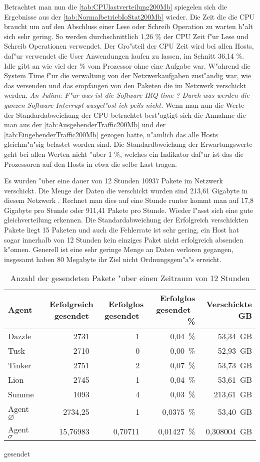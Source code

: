 Betrachtet man nun die \cref{tab:CPUlastverteilung200Mb} spiegelen sich die Ergebnisse aus der \cref{tab:NormalbetriebIoStat200Mb} wieder. %
Die Zeit die die CPU braucht um auf den Abschluss einer Lese oder Schreib Operation zu warten h"alt sich sehr gering. %
So werden durchschnittlich 1,26 \% der CPU Zeit f"ur Lese und Schreib Operationen verwendet. Der Gro"steil der CPU Zeit wird %
bei allen Hosts, daf"ur verwendet die User Anwendungen laufen zu lassen, im Schnitt 36,14 \%. Idle gibt an wie viel der \% vom Prozessor %
ohne eine Aufgabe war. W"ahrend die System Time f"ur die verwaltung von der Netzwerkaufgaben zust"andig war, wie das versenden und das empfangen von %
den Paketen die im Netzwerk verschickt werden. \emph{An Julian: F"ur was ist die Software IRQ time ? Durch was werden die ganzen Software Interrupt %
ausgel"ost ich peils nicht.}%
Wenn man nun die Werte der Standardabweichung der CPU betrachtet best"agtigt sich die Annahme die man aus der %
\cref{tab:AusgehenderTraffic200Mb} und der \cref{tab:EingehenderTraffic200Mb} gezogen hatte, n"amlich das alle Hosts gleichm"a"sig belastet worden sind. %
Die Standardbweichung der Erwartungswerte geht bei allen Werten nicht "uber 1 \%, welches ein Indikator daf"ur ist das die %
Prozessoren auf den Hosts in etwa die selbe Last tragen.  

Es wurden "uber eine dauer von 12 Stunden 10937 Pakete im Netzwerk verschickt. Die Menge der Daten die verschickt wurden sind 213,61 Gigabyte in diesem Netzwerk . %
Rechnet man dies auf eine Stunde runter kommt man auf 17,8 Gigabyte pro Stunde oder 911,41 Pakete pro Stunde. Wieder l"asst sich eine gute gleichverteilung erkennen. %
Die Standardabweichung der Erfolgreich verschickten Pakete liegt 15 Paketen und auch die Fehlerrate ist sehr gering, ein Host %
hat sogar innerhalb von 12 Stunden kein einziges Paket nicht erfolgreich absenden k"onnen. Generell ist eine sehr geringe Menge an Daten verloren %
gegangen, insgesamt haben 80 Megabyte ihr Ziel nicht Ordnungsgem"a"s erreicht. %
\begin{table}
\centering
\begin{tabular}{l%
 r<{\,}%
 r<{\,}%
 r<{\,\%}%
 r<{\,GB}%
}
Agent  				& Erfolgreich gesendet			& Erfolglos gesendet			& Erfolglos gesendet	& Verschickte	\\
\hline
Dazzle 				& 2731			 		& 1					& 0,04			& 53,34			\\
Tusk 				& 2710					& 0					& 0,00			& 52,93			\\
Tinker				& 2751					& 2					& 0,07			& 53,73			\\
Lion				& 2745					& 1					& 0,04			& 53,61			\\ 
Summe				& 1093					& 4					& 0,03 			& 213,61		\\
Agent $\diameter $  		& 2734,25				& 1				 	& 0,0375		& 53,40 		\\   
Agent $\sigma $			& 15,76983	 			& 0,70711				& 0,01427      		& 0,308004		\\
\end{tabular}
gesendet\caption{Anzahl der gesendeten Pakete "uber einen Zeitraum von 12 Stunden}
\label{tab:VerschickteDaten200Mb}
\end{table}




